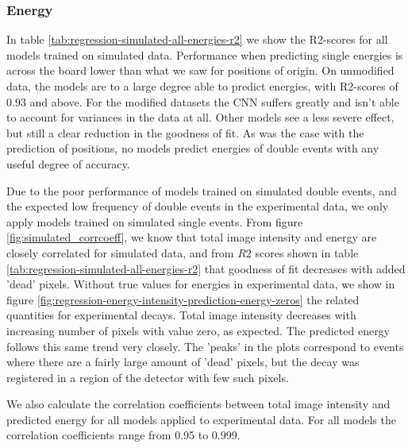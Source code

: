 \subsubsection{Energy}
In table \ref{tab:regression-simulated-all-energies-r2} we show the R2-scores for all
models trained on simulated data.
Performance when predicting single energies is across the board lower than what we saw
for positions of origin. On unmodified data, the models are to a large degree able to
predict energies, with R2-scores of 0.93 and above. For the modified datasets the CNN
suffers greatly and isn't able to account for variances in the data at all. Other models
see a less severe effect, but still a clear reduction in the goodness of fit.
As was the case with the prediction of positions, no models predict energies
of double events with any useful degree of accuracy.


Due to the poor performance of models trained on simulated double events, and the
expected low frequency of double events in the experimental data, we only apply models
trained on simulated single events. From figure \ref{fig:simulated_corrcoeff}, we know
that total image intensity and energy are closely correlated for simulated data,
and from $R2$ scores shown in table \ref{tab:regression-simulated-all-energies-r2}
that goodness of fit decreases with added 'dead' pixels. Without true values for
energies in experimental data, we show in figure \ref{fig:regression-energy-intensity-prediction-energy-zeros}
the related quantities for experimental decays. Total image intensity decreases with
increasing number of pixels with value zero, as expected. The predicted energy
follows this same trend very closely. The 'peaks' in the plots correspond to events
where there are a fairly large amount of 'dead' pixels, but the decay was registered
in a region of the detector with few such pixels.

We also calculate the correlation coefficients between total image intensity and
predicted energy for all models applied to experimental data. For all models the
correlation coefficients range from 0.95 to 0.999.
